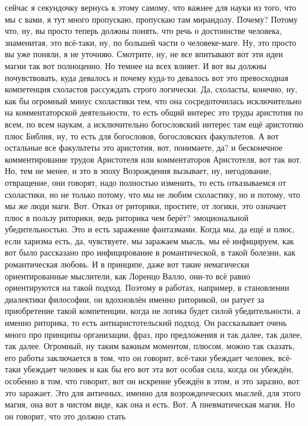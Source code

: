сейчас я секундочку вернусь к этому самому, что важнее для науки из того, что мы
с вами, я тут много пропускаю, пропускаю там мирандолу. Почему? Потому что, ну,
вы просто теперь должны понять, что речь о достоинстве человека, знаменитая, это
всё-таки, ну, по большей части о человеке-маге. Ну, это просто вы уже поняли, я
не уточняю. Смотрите, ну, не все впитывают вот эти идеи магии так вот
полноценно. Но темнее на всех влияет. И вот вы должны почувствовать, куда
девалось и почему куда-то девалось вот это превосходная компетенция схоластов
рассуждать строго логически. Да, схоласты, конечно, ну, как бы огромный минус
схоластики тем, что она сосредоточилась исключительно на комментаторской
деятельности, то есть общий интерес это труды аристотия по всем, по всем наукам,
а исключительно богословский интерес там ещё аристотию плюс Библия, ну, то есть
для богословов, богословских факультетов. А вот остальные все факультеты это
аристотия, вот, понимаете, да? и бесконечное комментирование трудов Аристотеля
или комментаторов Аристотеля, вот так вот. Но, тем не менее, и это в эпоху
Возрождения вызывает, ну, негодование, отвращение, они говорят, надо полностью
изменить, то есть отказываемся от схоластики, но не только потому, что мы не
любим схоластику, но и потому, что мы же люди маги. Вот. Отказ от риторики,
простите, от логики, это означает плюс в пользу риторики, ведь риторика чем
берёт? эмоциональной убедительностью. Это и есть заражение фантазмами. Когда мы,
да ещё и плюс, если харизма есть, да, чувствуете, мы заражаем мысль, мы её
инфицируем, как вот было рассказано про инфицирование в романтической, в такой
болезни, как романтическая любовь. И в принципе, даже вот такие немагически
ориентированные мыслители, как Лоренцо Валло, они-то всё равно ориентируются на
такой подход. Поэтому в работах, например, в становлении диалектики философии,
он вдохновлён именно риторикой, он ратует за приобретение такой компетенции,
когда не логика будет силой убедительности, а именно риторика, то есть
антиаристотельский подход. Он рассказывает очень много про принципы организации,
фраз, про предложения и так далее, так далее, так далее. Огромный, ну таким
важным моментом, плюсом, можно так сказать, его работы заключается в том, что он
говорит, всё-таки убеждает человек, всё-таки убеждает человек и как бы его вот
эта вот особая сила, когда он убеждён, особенно в том, что говорит, вот он
искренне убеждён в этом, и это заразно, вот это заражает. Это для античных,
именно для возрожденческих мыслей, для этого магия, она вот в чистом виде, как
она и есть. Вот. А пневматическая магия. Но он говорит, что это должно стать
